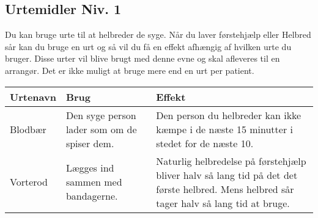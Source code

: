 \subsection{Urtemidler Niv. 1}
Du kan bruge urte til at helbreder de syge. Når du laver førstehjælp eller Helbred sår kan du bruge en urt og så vil du få en effekt afhængig af hvilken urte du bruger. Disse urter vil blive brugt med denne evne og skal afleveres til en arrangør. Det er ikke muligt at bruge mere end en urt per patient.
\begin{table}[H]
     \centering
    \begin{tabular}{|p{}|p{}|p{}|}
    \rowcolor{cerulean!80}\hline
        Urtenavn & Brug & Effekt \\\hline
        Blodbær & Den syge person lader som om de spiser dem. & Den person du helbreder kan ikke kæmpe i de næste 15 minutter i stedet for de næste 10.\\\hline
        Vorterod & Lægges ind sammen med bandagerne. &  Naturlig helbredelse på førstehjælp bliver halv så lang tid på det det første helbred. Mens helbred sår tager halv så lang tid at bruge.\\\hline
    \end{tabular}
\end{table}